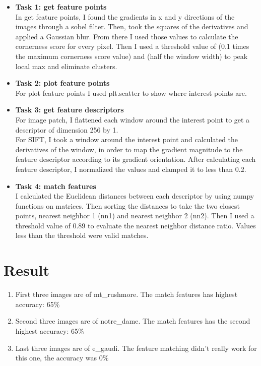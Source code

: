 \begin{itemize}
    \item \textbf{Task 1: get feature points} \\
    In get feature points, I found the gradients in x and y directions of the images through a sobel filter. Then, took the squares of the derivatives and applied a Gaussian blur. From there I used those values to calculate the cornerness score for every pixel. Then I used a threshold value of (0.1 times the maximum cornerness score value) and (half the window width) to peak local max and eliminate clusters. 
    \item \textbf{Task 2: plot feature points} \\
    For plot feature points I used plt.scatter to show where interest points are.
    \item \textbf{Task 3: get feature descriptors} \\
    For image patch, I flattened each window around the interest point to get a descriptor of dimension 256 by 1. \\
    For SIFT, I took a window around the interest point and calculated the derivatives of the window, in order to map the gradient magnitude to the feature descriptor according to its gradient orientation. After calculating each feature descriptor, I normalized the values and clamped it to less than 0.2.
    \item \textbf{Task 4: match features} \\
    I calculated the Euclidean distances between each descriptor by using numpy functions on matrices. Then sorting the distances to take the two closest points, nearest neighbor 1 (nn1) and nearest neighbor 2 (nn2). Then I used a threshold value of 0.89 to evaluate the nearest neighbor distance ratio. Values less than the threshold were valid matches. 

\end{itemize}

\section*{Result}

\begin{enumerate}
    \item First three images are of mt\_rushmore. The match features has highest accuracy: 65\%
    \item Second three images are of notre\_dame. The match features has the second highest accuracy: 65\%
    \item Last three images are of e\_gaudi. The feature matching didn't really work for this one, the accuracy was 0\%
\end{enumerate}

